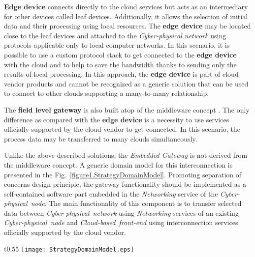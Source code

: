 \documentclass[runningheads]{llncs}
\begin{document}
\textbf{Edge device} connects directly to the cloud services but acts as an intermediary for other devices called leaf devices. Additionally, it allows the selection of initial data and their processing using local resources. The \textbf{edge device} may be located close to the leaf devices and attached to the \emph{Cyber-physical network} using protocols applicable only to local computer networks. In this scenario, it is possible to use a custom protocol stack to get connected to the \textbf{edge device} with the cloud and to help to save the bandwidth thanks to sending only the results of local processing. In this approach, the \textbf{edge device} is part of cloud vendor products and cannot be recognized as a generic solution that can be used to connect to other clouds supporting a many-to-many relationship.

The \textbf{field level gateway} is also built atop of the middleware concept \cite{Sunyaev2020}. The only difference as compared with the \textbf{edge device} is a necessity to use services officially supported by the cloud vendor to get connected. In this scenario, the process data may be transferred to many clouds simultaneously.

\begin{proposition}
      Unlike the above-described solutions, the \emph{Embedded Gateway} is not derived from the middleware concept. A generic domain model for this interconnection is presented in the Fig.~\ref{figure1.StrategyDomainModel}. Promoting separation of concerns design principle, the gateway functionality should be implemented as a self-contained software part embedded in the \emph{Networking} service of the \emph{Cyber-physical\ node}. The main functionality of this component is to transfer selected data between \emph{Cyber-physical\ network} using \emph{Networking} services of an existing \emph{Cyber-physical\ node} and \emph{Cloud-based\ front-end} using interconnection services officially supported by the cloud vendor.
\end{proposition}

\begin{wrapfigure}{t}{0.55\textwidth}
      \texttt{[image: StrategyDomainModel.eps]}
      \caption{Generic interconnection concept}\label{figure1.StrategyDomainModel}
\end{wrapfigure}
\end{document}
